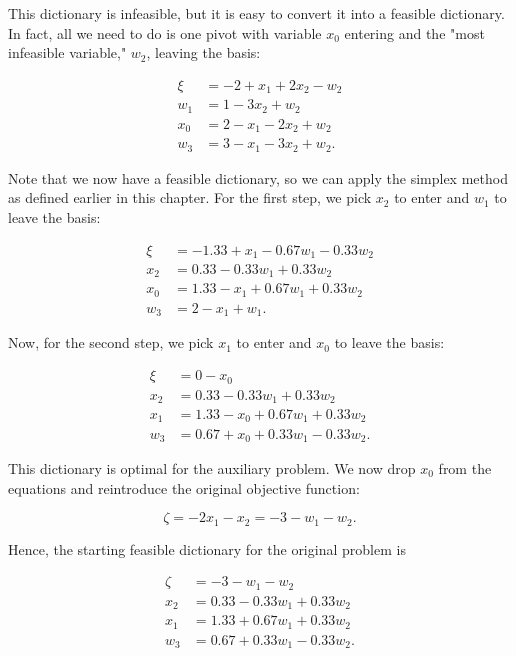 \documentclass{article}
\begin{document}
    This dictionary is infeasible, but it is easy to convert it into a feasible dictionary. In fact, all we need to do is one pivot with variable \( x_{0} \) entering and the "most infeasible variable," \( w_{2} \), leaving the basis:
    
    \[
    \begin{split}
    \xi &= -2 + x_{1} + 2x_{2} - w_{2} \\
    w_1 &= 1 - 3x_{2} + w_{2} \\
    x_0 &= 2 - x_{1} - 2x_{2} + w_{2} \\
    w_3 &= 3 - x_{1} - 3x_{2} + w_{2}.
    \end{split}
    \]
    
    Note that we now have a feasible dictionary, so we can apply the simplex method as defined earlier in this chapter. For the first step, we pick \( x_{2} \) to enter and \( w_{1} \) to leave the basis:
    
    \[
    \begin{split}
    \xi &= -1.33 + x_{1} - 0.67w_{1} - 0.33w_{2} \\
    x_2 &= 0.33 - 0.33w_{1} + 0.33w_{2} \\
    x_0 &= 1.33 - x_{1} + 0.67w_{1} + 0.33w_{2} \\
    w_3 &= 2 - x_{1} + w_{1}.
    \end{split}
    \]
    
    Now, for the second step, we pick \( x_{1} \) to enter and \( x_{0} \) to leave the basis:
    
    \[
    \begin{split}
    \xi &= 0 - x_{0} \\
    x_2 &= 0.33 - 0.33w_{1} + 0.33w_{2} \\
    x_1 &= 1.33 - x_{0} + 0.67w_{1} + 0.33w_{2} \\
    w_3 &= 0.67 + x_{0} + 0.33w_{1} - 0.33w_{2}.
    \end{split}
    \]
    
    This dictionary is optimal for the auxiliary problem. We now drop \( x_{0} \) from the equations and reintroduce the original objective function:
    
    \[
    \zeta = -2x_{1} - x_{2} = -3 - w_{1} - w_{2}.
    \]
    
    Hence, the starting feasible dictionary for the original problem is
    
    \[
    \begin{split}
    \zeta &= -3 - w_{1} - w_{2} \\
    x_2 &= 0.33 - 0.33w_{1} + 0.33w_{2} \\
    x_1 &= 1.33 + 0.67w_{1} + 0.33w_{2} \\
    w_3 &= 0.67 + 0.33w_{1} - 0.33w_{2}.
    \end{split}
    \]
    
\end{document}
